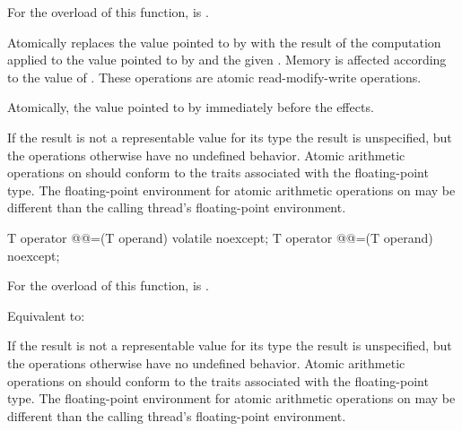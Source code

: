 \begin{itemdescr}
\pnum
\constraints
For the  overload of this function,
 is .

\pnum
\effects
Atomically replaces the value pointed to by 
with the result of the computation applied to the value pointed
to by  and the given .
Memory is affected according to the value of .
These operations are atomic read-modify-write operations.

\pnum
\returns
Atomically, the value pointed to by  immediately before the effects.

\pnum
\remarks
If the result is not a representable value for its type
the result is unspecified, but the operations otherwise have no undefined
behavior. Atomic arithmetic operations on 
should conform to the 
traits associated with the floating-point type.
The floating-point environment for atomic arithmetic operations
on  may be different than the
calling thread's floating-point environment.
\end{itemdescr}

%
%
%
%
\begin{itemdecl}
T operator @@=(T operand) volatile noexcept;
T operator @@=(T operand) noexcept;
\end{itemdecl}

\begin{itemdescr}
\pnum
\constraints
For the  overload of this function,
 is .

\pnum
\effects
Equivalent to: 

\pnum
\remarks
If the result is not a representable value for its type
the result is unspecified, but the operations otherwise have no undefined
behavior. Atomic arithmetic operations on 
should conform to the 
traits associated with the floating-point type.
The floating-point environment for atomic arithmetic operations
on  may be different than the
calling thread's floating-point environment.
\end{itemdescr}

